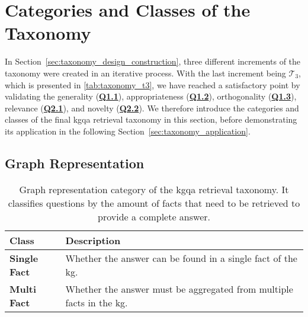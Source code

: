 
\section{Categories and Classes of the Taxonomy}
\label{sec:taxonomy_final}


In Section~\ref{sec:taxonomy_design_construction}, three different increments of the taxonomy were created in an iterative process. With the last increment being $\mathcal{T}_3$, which is presented in \autoref{tab:taxonomy_t3}, we have reached a satisfactory point by validating the generality (\hyperref[tab:gqm_taxonomy_validation]{\textbf{Q1.1}}), appropriateness (\hyperref[tab:gqm_taxonomy_validation]{\textbf{Q1.2}}), orthogonality (\hyperref[tab:gqm_taxonomy_validation]{\textbf{Q1.3}}), relevance (\hyperref[tab:gqm_taxonomy_validation]{\textbf{Q2.1}}), and novelty (\hyperref[tab:gqm_taxonomy_validation]{\textbf{Q2.2}}). We therefore introduce the categories and classes of the final \gls{kgqa} retrieval taxonomy in this section, before demonstrating its application in the following Section~\ref{sec:taxonomy_application}.

\subsection{Graph Representation}

\begin{table}[t]
    \centering
    \begin{tabular}{@{}lp{8cm}@{}}
        \toprule
        \textbf{Class} & \textbf{Description} \\
        \midrule
        \textbf{Single Fact}
            & Whether the answer can be found in a single fact of the \gls{kg}.\\
        \cmidrule(l){1-2}
            \textbf{Multi Fact}
            & Whether the answer must be aggregated from multiple facts in the \gls{kg}.\\
        \bottomrule
    \end{tabular}
    \caption[Graph Representation Category of the Taxonomy]{Graph representation category of the \gls{kgqa} retrieval taxonomy. It classifies questions by the amount of facts that need to be retrieved to provide a complete answer.}
    \label{tab:graph_representation}
\end{table}

